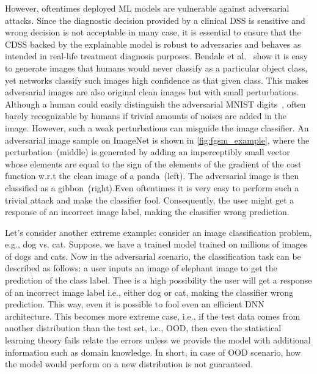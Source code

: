 \hspace*{3.5mm} However, oftentimes deployed ML models are vulnerable against adversarial attacks. Since the diagnostic decision provided by a clinical DSS is sensitive and wrong decision is not acceptable in many case, it is essential to ensure that the CDSS backed by the explainable model is robust to adversaries and behaves as intended in real-life treatment diagnosis purposes. Bendale et al.~\cite{OOD18} show it is easy to generate images that humans would never classify as a particular object class, yet networks classify such images high confidence as that given class. This makes adversarial images are also original clean images but with small perturbations. Although a human could easily distinguish the adversarial MNIST digits~\cite{yuan2019adversarial}, often barely recognizable by humans if trivial amounts of noises are added in the image. However, such a weak perturbations can misguide the image classifier. An adversarial image sample on ImageNet is shown in \cref{fig:fgsm_example}, where the perturbation~(middle) is generated by adding an imperceptibly small vector whose elements are equal to the sign of the elements of the gradient of the cost function w.r.t the clean image of a panda~(left). The adversarial image is then classified as a gibbon~(right).Even oftentimes it is very easy to perform such a trivial attack and make the classifier fool. Consequently, the user might get a response of an incorrect image label, making the classifier wrong prediction. 

\hspace*{3.5mm} Let's consider another extreme example: consider an image classification problem, e.g., dog vs. cat. Suppose, we have a trained model trained on millions of images of dogs and cats. Now in the adversarial scenario, the classification task can be described as follows: a user inputs an image of elephant image to get the prediction of the class label. Thee is a high possibility the user will get a response of an incorrect image label i.e., either dog or cat, making the classifier wrong prediction. This way, even it is possible to fool even an efficient DNN architecture. This becomes more extreme case, i.e., if the test data comes from another distribution than the test set, i.e., OOD, then even the statistical learning theory fails relate the errors unless we provide the model with additional information such as domain knowledge. In short, in case of OOD scenario, how the model would perform on a new distribution is not guaranteed. 

